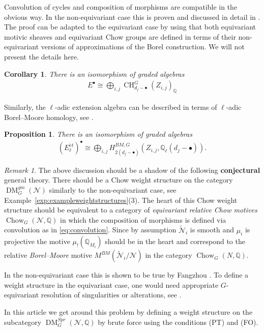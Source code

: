 \documentclass{amsart}
\theoremstyle{plain}
\newtheorem{proposition}[theorem]{Proposition}
\newtheorem{corollary}[theorem]{Corollary}
\theoremstyle{TheoremNum}
\theoremstyle{definition}
\theoremstyle{remark}
\newtheorem{remark}[theorem]{Remark}
\numberwithin{equation}{section}
\newcommand{\Q}{\mathbb{Q}}
\newcommand{\M}{\widetilde{\mathcal{N}}}
\newcommand{\N}{\mathcal{N}}
\newcommand{\Chow}{\operatorname{CH}}
\newcommand{\DM}{\operatorname{DM}}
\begin{document}
Convolution of cycles and composition of morphisms are compatible in the obvious way. In the non-equivariant case this is proven and discussed in detail in \cite{fangzhou_borelmoore_2016}. The proof can be adapted to the equivariant case by using that both equivariant motivic sheaves and equivariant Chow groups are defined in terms of their non-equivariant versions of approximations of the Borel construction. We will not present the details here.
\begin{corollary}\label{cor:extensionalgebraaschowgroups} There is an isomorphism of graded algebras
\begin{align}\label{eq:extensionalgebraaschowgroups}
    E^\bullet\cong\bigoplus_{i,j}\Chow_{d_j-\bullet}^G(Z_{i,j})_\Q
\end{align}
\end{corollary}
Similarly, the $\ell$-adic extension algebra can be described in terms of $\ell$-adic Borel--Moore homology, see \cite[Section 8.6]{chriss_representation_2010}.
\begin{proposition}\label{prop:elladicextensionalgebraasborelmoore} There is an isomorphism of graded algebras
\begin{align}\label{eq:extensionalgebraborelmoore}
    (E^{\acute{e}t}_\ell)^\bullet\cong\bigoplus_{i,j}H^{BM,G}_{2(d_j-\bullet)}(Z_{i,j},\Q_\ell(d_j-\bullet)).
\end{align}
\end{proposition}
\begin{remark}
The above discussion should be a shadow of the following \textbf{conjectural} general theory.  There should be a Chow weight structure on the category $\DM_G^{gm}(\N)$ similarly to the non-equivariant case, see Example~\ref{exp:exampleweightstructures}(3). The heart of this Chow weight structure should be equivalent to a category of \emph{equivariant relative Chow motives} $\operatorname{Chow}_G(\N,\Q)$ in which the composition of morphisms is defined via convolution as in \eqref{eq:convolution}. Since by assumption $\M_i$ is smooth and $\mu_i$ is projective the motive $\mu_!(\Q_{M_i})$ should be in the heart and correspond to the relative \emph{Borel--Moore} motive $M^{BM}(\M_i/\N)$ in the category $\operatorname{Chow}_G(N,\Q).$

In the non-equivariant case this is shown to be true by Fangzhou \cite{fangzhou_borelmoore_2016}. To define a weight structure in the equivariant case, one would need appropriate $G$-equivariant resolution of singularities or alterations, see \cite[Remark II.4.15]{soergel_equivariant_2018}.

In this article we get around this problem by defining a weight structure on the subcategory $\DM^{Spr}_G(\N,\Q)$ by brute force using the conditions (PT) and (FO). 
\end{remark}
\end{document}
